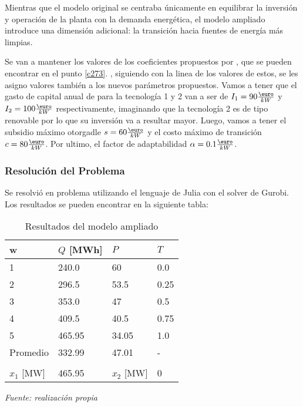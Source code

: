 \vspace{2.5mm}
Mientras que el modelo original se centraba únicamente en equilibrar la inversión y operación de la planta con la demanda energética, el modelo ampliado introduce una dimensión adicional: la transición hacia fuentes de energía más limpias.

\vspace{2.5mm}
Se van a mantener los valores de los coeficientes propuestos por , que se pueden encontrar en el punto \ref{c273}. , siguiendo con la linea de los valores de estos, se les asigno valores también a los nuevos parámetros propuestos. Vamos a tener que el gasto de capital anual de  para la tecnología 1 y 2 van a ser de \(I_1=90 \frac{\textup{\euro}}{kW}\) y \(I_2=100 \frac{\textup{\euro}}{kW}\) respectivamente, imaginando que la tecnología 2 es de tipo renovable por lo que su inversión va a resultar mayor. Luego, vamos a tener el subsidio máximo otorgadle \(s=60 \frac{\textup{\euro}}{kW}\) y el costo máximo de transición \(c=80 \frac{\textup{\euro}}{kW}\). Por ultimo, el factor de adaptabilidad 
\(\alpha=0.1 \frac{\textup{\euro}}{kW}\).

\subsubsection{Resolución del Problema}

Se resolvió en problema utilizando el lenguaje de Julia con el solver de Gurobi. Los resultados se pueden encontrar en la siguiente tabla:

\begin{table}[H]
\centering
\begin{tabular}{|l|l|l|l|}
\hline
w & \( Q \) [MWh] & \( P \) & \( T \) \\ \hline
1 & 240.0 & 60 & 0.0 \\ \hline
2 & 296.5 & 53.5 & 0.25 \\ \hline
3 & 353.0 & 47 & 0.5 \\ \hline
4 & 409.5 & 40.5 & 0.75 \\ \hline
5 & 465.95 & 34.05 & 1.0 \\ \hline
Promedio & 332.99 & 47.01 & -\\ \hline
 &  &  &     \\ \hline
\( x_1 \) [MW] & 465.95 & \( x_2 \) [MW]& 0 \\ \hline
\end{tabular}
\caption{Resultados del modelo ampliado}
\label{tabla:modelo_ampliado_T}
\textit{Fuente: realización propia}
\end{table}


